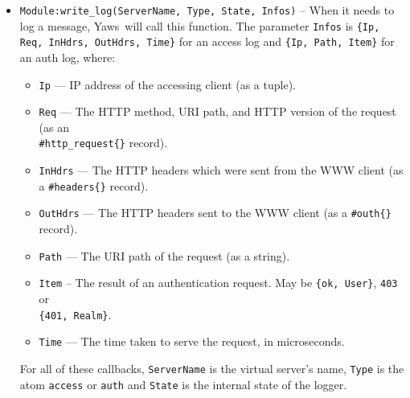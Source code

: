 \documentclass[11pt,oneside,english]{book}
\newcommand{\Yaws}            %
        {{\sc Yaws}}
\begin{document}
\begin{itemize}
\begin{itemize}
              \item \verb+Module:write_log(ServerName, Type, State, Infos)+ --
                When it needs to log a message, \Yaws\ will call this
                function. The parameter \verb+Infos+ is
                \verb+{Ip, Req, InHdrs, OutHdrs, Time}+ for an access log and
                \verb+{Ip, Path, Item}+ for an auth log, where:

                      \begin{itemize}
                      \item \verb+Ip+ --- IP address of the accessing client (as
                        a tuple).

                      \item \verb+Req+ --- The HTTP method, URI path, and HTTP
                        version of the request (as an\\ \verb+#http_request{}+
                        record).

                      \item \verb+InHdrs+ --- The HTTP headers which were sent
                        from the WWW client (as a \verb+#headers{}+ record).

                      \item \verb+OutHdrs+ --- The HTTP headers sent to the WWW
                        client (as a \verb+#outh{}+ record).

                      \item \verb+Path+ --- The URI path of the request (as a
                        string).

                      \item \verb+Item+ -- The result of an authentication
                        request. May be \verb+{ok, User}+, \verb+403+ or\\
                        \verb+{401, Realm}+.

                      \item \verb+Time+ --- The time taken to serve the request,
                        in microseconds.
                      \end{itemize}

              For all of these callbacks, \verb+ServerName+ is the virtual
              server's name, \verb+Type+ is the atom \verb+access+ or
              \verb+auth+ and \verb+State+ is the internal state of the logger.

              \end{itemize}


\end{itemize}
\end{document}
